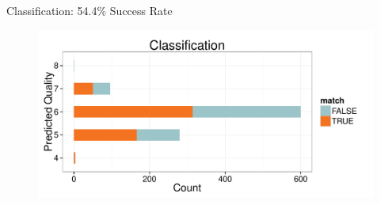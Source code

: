 \documentclass{beamer}
\begin{document}
%




\begin{frame}{Classification: 54.4\% Success Rate}
	\begin{figure}
		\centering
		\includegraphics[width=\textwidth]{../images/Classification_Results.pdf}
	\end{figure}
\end{frame}
\end{document}

